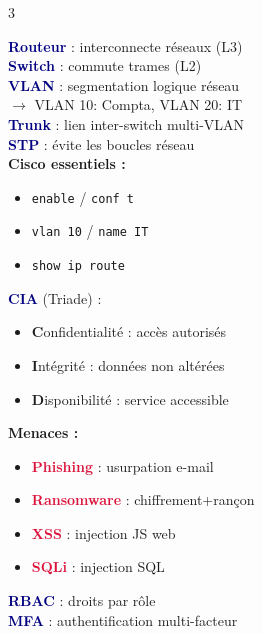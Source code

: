 \documentclass[a4paper,9pt]{article}
\newcommand{\key}[1]{\textbf{\textcolor{navy}{#1}}}
\newcommand{\warn}[1]{\textbf{\textcolor{crimson}{#1}}}
\begin{document}
\begin{multicols}{3}
\begin{tcolorbox}[basebox, colframe=navy, title=ROUTAGE \& VLAN]
\key{Routeur} : interconnecte réseaux (L3) \\
\key{Switch} : commute trames (L2) \\
\key{VLAN} : segmentation logique réseau \\
\quad $\to$ VLAN 10: Compta, VLAN 20: IT \\
\key{Trunk} : lien inter-switch multi-VLAN \\
\key{STP} : évite les boucles réseau \\[2pt]
\textbf{Cisco essentiels :}
\begin{itemize}
  \item \texttt{enable} / \texttt{conf t}
  \item \texttt{vlan 10} / \texttt{name IT}
  \item \texttt{show ip route}
\end{itemize}
\end{tcolorbox}

\begin{tcolorbox}[basebox, colframe=crimson, title=CYBERSÉCURITÉ — Piliers]
\key{CIA} (Triade) :
\begin{itemize}
  \item \textbf{C}onfidentialité : accès autorisés
  \item \textbf{I}ntégrité : données non altérées
  \item \textbf{D}isponibilité : service accessible
\end{itemize}
\textbf{Menaces :}
\begin{itemize}
  \item \warn{Phishing} : usurpation e-mail
  \item \warn{Ransomware} : chiffrement+rançon
  \item \warn{XSS} : injection JS web
  \item \warn{SQLi} : injection SQL
\end{itemize}
\key{RBAC} : droits par rôle \\
\key{MFA} : authentification multi-facteur
\end{tcolorbox}


\end{multicols}
\end{document}

